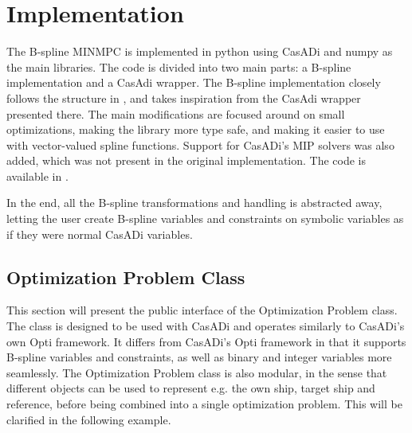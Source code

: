 \section{Implementation}\label{sec:python-implementation}

The B-spline MINMPC is implemented in python using CasADi \citep{casadi} and numpy \citep{numpy} as the main libraries. The code is divided into two main parts: a B-spline implementation and a CasAdi wrapper. 
The B-spline implementation closely follows the structure in \citet{mercy2016spline}, and takes inspiration from the CasAdi wrapper presented there. The main modifications are focused around on small optimizations, making the library more type safe, and making it easier to use with vector-valued spline functions. Support for CasADi's MIP solvers was also added, which was not present in the original implementation. 
The code is available in .

In the end, all the B-spline transformations and handling is abstracted away, letting the user create B-spline variables and constraints on symbolic variables as if they were normal CasADi variables. 

\subsection{Optimization Problem Class}
This section will present the public interface of the Optimization Problem class. The class is designed to be used with CasADi and operates similarly to CasADi's own Opti framework. It differs from CasADi's Opti framework in that it supports B-spline variables and constraints, as well as binary and integer variables more seamlessly. The Optimization Problem class is also modular, in the sense that different objects can be used to represent e.g. the own ship, target ship and reference, before being combined into a single optimization problem. This will be clarified in the following example.

